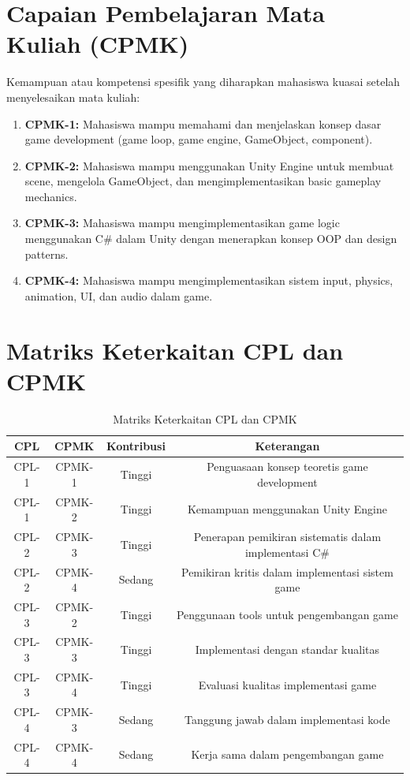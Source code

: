 \section*{Capaian Pembelajaran Mata Kuliah (CPMK)}

Kemampuan atau kompetensi spesifik yang diharapkan mahasiswa kuasai setelah menyelesaikan mata kuliah:

\begin{enumerate}
  \item \textbf{CPMK-1:} Mahasiswa mampu memahami dan menjelaskan konsep dasar game development (game loop, game engine, GameObject, component).
  
  \item \textbf{CPMK-2:} Mahasiswa mampu menggunakan Unity Engine untuk membuat scene, mengelola GameObject, dan mengimplementasikan basic gameplay mechanics.
  
  \item \textbf{CPMK-3:} Mahasiswa mampu mengimplementasikan game logic menggunakan C\# dalam Unity dengan menerapkan konsep OOP dan design patterns.
  
  \item \textbf{CPMK-4:} Mahasiswa mampu mengimplementasikan sistem input, physics, animation, UI, dan audio dalam game.
\end{enumerate}

\section*{Matriks Keterkaitan CPL dan CPMK}

\begin{table}[h]
\centering
\begin{tabular}{cccc}
  \toprule
  \textbf{CPL} & \textbf{CPMK} & \textbf{Kontribusi} & \textbf{Keterangan} \\
  \midrule
  CPL-1 & CPMK-1 & Tinggi & Penguasaan konsep teoretis game development \\
  CPL-1 & CPMK-2 & Tinggi & Kemampuan menggunakan Unity Engine \\
  CPL-2 & CPMK-3 & Tinggi & Penerapan pemikiran sistematis dalam implementasi C\# \\
  CPL-2 & CPMK-4 & Sedang & Pemikiran kritis dalam implementasi sistem game \\
  CPL-3 & CPMK-2 & Tinggi & Penggunaan tools untuk pengembangan game \\
  CPL-3 & CPMK-3 & Tinggi & Implementasi dengan standar kualitas \\
  CPL-3 & CPMK-4 & Tinggi & Evaluasi kualitas implementasi game \\
  CPL-4 & CPMK-3 & Sedang & Tanggung jawab dalam implementasi kode \\
  CPL-4 & CPMK-4 & Sedang & Kerja sama dalam pengembangan game \\
  \bottomrule
\end{tabular}
\caption{Matriks Keterkaitan CPL dan CPMK}
\end{table}

